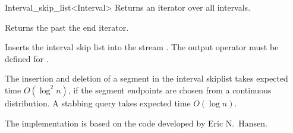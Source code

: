 \begin{ccRefClass} {Interval_skip_list<Interval>}
{Returns an iterator over all intervals.}

{Returns the past the end iterator.}




{Inserts the interval skip list  into the stream .
\ccPrecond The output operator must be defined for .}


\ccImplementation
The insertion and deletion of a segment in the interval skiplist
takes expected time $O(\log^2 n)$, if the segment endpoints are
chosen from a continuous distribution. A stabbing query takes expected 
time $O(\log n)$.

The implementation is based on the code developed by Eric N.~Hansen.
\end{ccRefClass}

